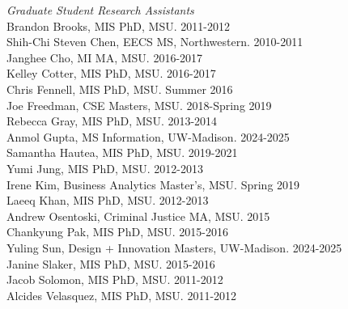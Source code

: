\documentclass[9pt]{extarticle}
\begin{document}
\emph{Graduate Student Research Assistants} \\[1pt]
Brandon Brooks, MIS PhD, MSU. 2011-2012 \\
Shih-Chi Steven Chen, EECS MS, Northwestern. 2010-2011 \\
Janghee Cho, MI MA, MSU. 2016-2017 \\
Kelley Cotter, MIS PhD, MSU. 2016-2017 \\
Chris Fennell, MIS PhD, MSU. Summer 2016 \\
Joe Freedman, CSE Masters, MSU. 2018-Spring 2019 \\
Rebecca Gray, MIS PhD, MSU. 2013-2014 \\
Anmol Gupta, MS Information, UW-Madison. 2024-2025 \\
Samantha Hautea, MIS PhD, MSU. 2019-2021 \\
Yumi Jung, MIS PhD, MSU. 2012-2013 \\
Irene Kim, Business Analytics Master's, MSU. Spring 2019 \\
Laeeq Khan, MIS PhD, MSU. 2012-2013 \\
Andrew Osentoski, Criminal Justice MA, MSU. 2015 \\
Chankyung Pak, MIS PhD, MSU. 2015-2016 \\
Yuling Sun, Design + Innovation Masters, UW-Madison. 2024-2025 \\
Janine Slaker, MIS PhD, MSU. 2015-2016 \\
Jacob Solomon, MIS PhD, MSU. 2011-2012 \\
Alcides Velasquez, MIS PhD, MSU. 2011-2012
\end{document}

